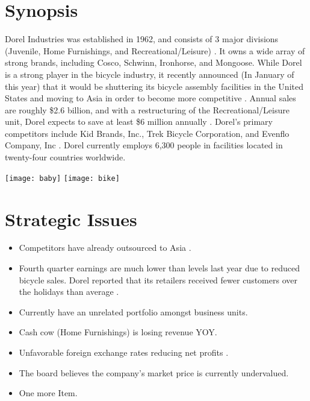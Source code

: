 
\begingroup
\let\clearpage\relax
\let\cleardoublepage\relax
\let\cleardoublepage\relax

\chapter*{Synopsis}
Dorel Industries was established in 1962, and consists of 3 major divisions (Juvenile, Home Furnishings, and Recreational/Leisure) \cite{DorelIndustries2013}.  It owns a wide array of strong brands, including Cosco, Schwinn, Ironhorse, and Mongoose.  While Dorel is a strong player in the bicycle industry, it recently announced (In January of this year) that it would be shuttering its bicycle assembly facilities in the United States and moving to Asia in order to become more competitive \cite{Marotte2014}.  Annual sales are roughly \$2.6 billion, and with a restructuring of the Recreational/Leisure unit, Dorel expects to save at least \$6 million annually \cite{Carpiet2014}.  Dorel’s primary competitors include Kid Brands, Inc., Trek Bicycle Corporation, and Evenflo Company, Inc \cite{Hoovers2014}.  Dorel currently employs 6,300 people in facilities located in twenty-four countries worldwide.

\vfill
{\texttt{[image: baby]}} 
{\texttt{[image: bike]}} 
\vfill
{}
\chapter*{Strategic Issues}

\begin{itemize}
  \item Competitors have already outsourced to Asia \cite{VoiceofAmerica2009}.
  \item Fourth quarter earnings are much lower than levels last year due to reduced bicycle sales.  Dorel reported that its retailers received fewer customers over the holidays than average \cite{Symon2014}.
  \item Currently have an unrelated portfolio amongst business units.
  \item Cash cow (Home Furnishings) is losing revenue YOY.
  \item Unfavorable foreign exchange rates reducing net profits \cite{Symon2014}.
  \item The board believes the company’s market price is currently undervalued.
  \item One more Item.
\end{itemize}

